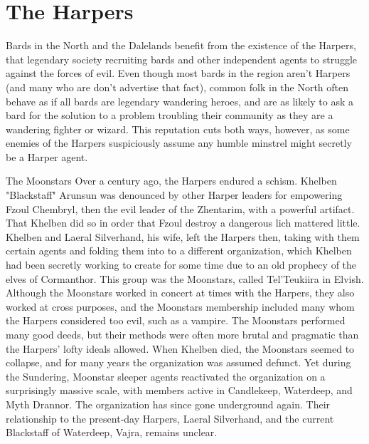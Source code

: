 \documentclass[10pt,a4paper,twoside,twocolumn,openany,bg=print,nodeprecatedcode]{dndbook}
\begin{document}
\section{The Harpers}
Bards in the North and the Dalelands benefit from the existence of the Harpers, that legendary society recruiting bards and other independent agents to struggle against the forces of evil. Even though most bards in the region aren't Harpers (and many who are don't advertise that fact), common folk in the North often behave as if all bards are legendary wandering heroes, and are as likely to ask a bard for the solution to a problem troubling their community as they are a wandering fighter or wizard. This reputation cuts both ways, however, as some enemies of the Harpers suspiciously assume any humble minstrel might secretly be a Harper agent.
\begin{DndComment}{The Moonstars}
Over a century ago, the Harpers endured a schism. Khelben "Blackstaff" Arunsun was denounced by other Harper leaders for empowering Fzoul Chembryl, then the evil leader of the Zhentarim, with a powerful artifact. That Khelben did so in order that Fzoul destroy a dangerous lich mattered little. Khelben and Laeral Silverhand, his wife, left the Harpers then, taking with them certain agents and folding them into to a different organization, which Khelben had been secretly working to create for some time due to an old prophecy of the elves of Cormanthor. This group was the Moonstars, called Tel'Teukiira in Elvish. Although the Moonstars worked in concert at times with the Harpers, they also worked at cross purposes, and the Moonstars membership included many whom the Harpers considered too evil, such as a vampire. The Moonstars performed many good deeds, but their methods were often more brutal and pragmatic than the Harpers' lofty ideals allowed. When Khelben died, the Moonstars seemed to collapse, and for many years the organization was assumed defunct. Yet during the Sundering, Moonstar sleeper agents reactivated the organization on a surprisingly massive scale, with members active in Candlekeep, Waterdeep, and Myth Drannor. The organization has since gone underground again. Their relationship to the present-day Harpers, Laeral Silverhand, and the current Blackstaff of Waterdeep, Vajra, remains unclear.
\end{DndComment}
\end{document}
